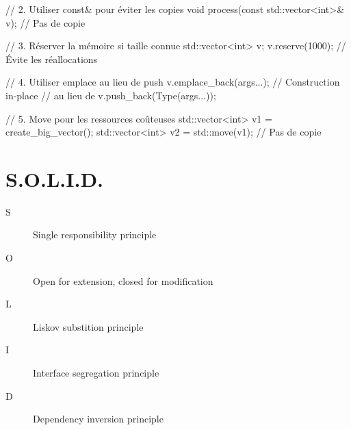 \documentclass{article}
\begin{document}
\begin{multicols*}{4}
\begin{cppcode}
// 2. Utiliser const& pour éviter les copies
void process(const std::vector<int>& v); // Pas de copie

// 3. Réserver la mémoire si taille connue
std::vector<int> v;
v.reserve(1000); // Évite les réallocations

// 4. Utiliser emplace au lieu de push
v.emplace_back(args...); // Construction in-place
// au lieu de v.push_back(Type(args...));

// 5. Move pour les ressources coûteuses
std::vector<int> v1 = create_big_vector();
std::vector<int> v2 = std::move(v1); // Pas de copie
\end{cppcode}

\section*{S.O.L.I.D.}
\begin{description}
    \item[S] Single responsibility principle
    \item[O] Open for extension, closed for modification
    \item[L] Liskov substition principle
    \item[I] Interface segregation principle
    \item[D] Dependency inversion principle
\end{description}

\end{multicols*}
\end{document}
